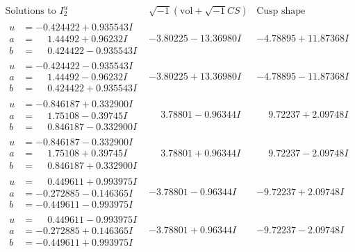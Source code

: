 \documentclass[1p]{elsarticle_modified}
\theoremstyle{definition}
\newcommand{\I}{\sqrt{-1}}
\begin{document}
$$\begin{array}{c|c|c}  
\text{Solutions to }I^u_{2}& \I (\text{vol} + \sqrt{-1}CS) & \text{Cusp shape}\\
 \hline 
\begin{aligned}
u &= -0.424422 + 0.935543 I \\
a &= \phantom{-}1.44492 + 0.96232 I \\
b &= \phantom{-}0.424422 - 0.935543 I\end{aligned}
 & -3.80225 - 13.36980 I & -4.78895 + 11.87368 I \\ \hline\begin{aligned}
u &= -0.424422 - 0.935543 I \\
a &= \phantom{-}1.44492 - 0.96232 I \\
b &= \phantom{-}0.424422 + 0.935543 I\end{aligned}
 & -3.80225 + 13.36980 I & -4.78895 - 11.87368 I \\ \hline\begin{aligned}
u &= -0.846187 + 0.332900 I \\
a &= \phantom{-}1.75108 - 0.39745 I \\
b &= \phantom{-}0.846187 - 0.332900 I\end{aligned}
 & \phantom{-}3.78801 - 0.96344 I & \phantom{-}9.72237 + 2.09748 I \\ \hline\begin{aligned}
u &= -0.846187 - 0.332900 I \\
a &= \phantom{-}1.75108 + 0.39745 I \\
b &= \phantom{-}0.846187 + 0.332900 I\end{aligned}
 & \phantom{-}3.78801 + 0.96344 I & \phantom{-}9.72237 - 2.09748 I \\ \hline\begin{aligned}
u &= \phantom{-}0.449611 + 0.993975 I \\
a &= -0.272885 - 0.146365 I \\
b &= -0.449611 - 0.993975 I\end{aligned}
 & -3.78801 - 0.96344 I & -9.72237 + 2.09748 I \\ \hline\begin{aligned}
u &= \phantom{-}0.449611 - 0.993975 I \\
a &= -0.272885 + 0.146365 I \\
b &= -0.449611 + 0.993975 I\end{aligned}
 & -3.78801 + 0.96344 I & -9.72237 - 2.09748 I \\ \hline\begin{aligned}

\end{aligned}
\end{array}$$
\end{document}
